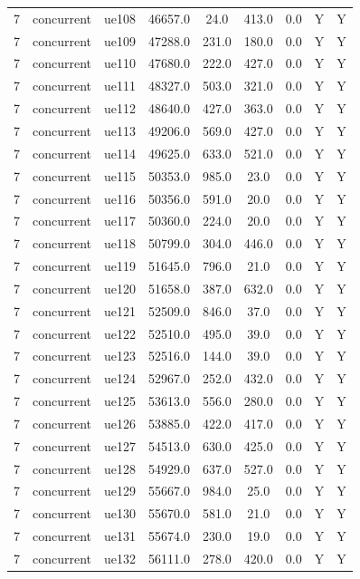 \begin{table}[ht]
\begin{tabular}{|c|c|c|c|c|c|c|c|c|}
7 & concurrent & ue108 & 46657.0 & 24.0 & 413.0 & 0.0 & Y & Y \\
7 & concurrent & ue109 & 47288.0 & 231.0 & 180.0 & 0.0 & Y & Y \\
7 & concurrent & ue110 & 47680.0 & 222.0 & 427.0 & 0.0 & Y & Y \\
7 & concurrent & ue111 & 48327.0 & 503.0 & 321.0 & 0.0 & Y & Y \\
7 & concurrent & ue112 & 48640.0 & 427.0 & 363.0 & 0.0 & Y & Y \\
7 & concurrent & ue113 & 49206.0 & 569.0 & 427.0 & 0.0 & Y & Y \\
7 & concurrent & ue114 & 49625.0 & 633.0 & 521.0 & 0.0 & Y & Y \\
7 & concurrent & ue115 & 50353.0 & 985.0 & 23.0 & 0.0 & Y & Y \\
7 & concurrent & ue116 & 50356.0 & 591.0 & 20.0 & 0.0 & Y & Y \\
7 & concurrent & ue117 & 50360.0 & 224.0 & 20.0 & 0.0 & Y & Y \\
7 & concurrent & ue118 & 50799.0 & 304.0 & 446.0 & 0.0 & Y & Y \\
7 & concurrent & ue119 & 51645.0 & 796.0 & 21.0 & 0.0 & Y & Y \\
7 & concurrent & ue120 & 51658.0 & 387.0 & 632.0 & 0.0 & Y & Y \\
7 & concurrent & ue121 & 52509.0 & 846.0 & 37.0 & 0.0 & Y & Y \\
7 & concurrent & ue122 & 52510.0 & 495.0 & 39.0 & 0.0 & Y & Y \\
7 & concurrent & ue123 & 52516.0 & 144.0 & 39.0 & 0.0 & Y & Y \\
7 & concurrent & ue124 & 52967.0 & 252.0 & 432.0 & 0.0 & Y & Y \\
7 & concurrent & ue125 & 53613.0 & 556.0 & 280.0 & 0.0 & Y & Y \\
7 & concurrent & ue126 & 53885.0 & 422.0 & 417.0 & 0.0 & Y & Y \\
7 & concurrent & ue127 & 54513.0 & 630.0 & 425.0 & 0.0 & Y & Y \\
7 & concurrent & ue128 & 54929.0 & 637.0 & 527.0 & 0.0 & Y & Y \\
7 & concurrent & ue129 & 55667.0 & 984.0 & 25.0 & 0.0 & Y & Y \\
7 & concurrent & ue130 & 55670.0 & 581.0 & 21.0 & 0.0 & Y & Y \\
7 & concurrent & ue131 & 55674.0 & 230.0 & 19.0 & 0.0 & Y & Y \\
7 & concurrent & ue132 & 56111.0 & 278.0 & 420.0 & 0.0 & Y & Y \\

\end{tabular}
\end{table}
